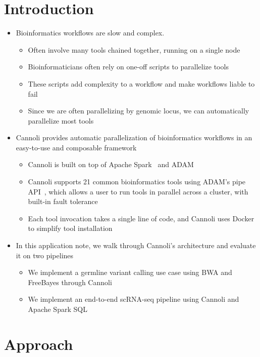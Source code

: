 \documentclass{bioinfo}
\begin{document}
\section{Introduction}

\begin{itemize}
\item Bioinformatics workflows are slow and complex.
  \begin{itemize}
  \item Often involve many tools chained together, running on a single node
  \item Bioinformaticians often rely on one-off scripts to parallelize tools
  \item These scripts add complexity to a workflow and make workflows liable to fail
  \item Since we are often parallelizing by genomic locus, we can automatically parallelize most tools
  \end{itemize}
\item Cannoli provides automatic parallelization of bioinformatics workflows in an easy-to-use and
  composable framework
  \begin{itemize}
  \item Cannoli is built on top of Apache Spark~\citep{zaharia12} and ADAM~\citep{massie13, nothaft15}
  \item Cannoli supports 21 common bioinformatics tools using ADAM's pipe API~\citep{nothaft17}, which
    allows a user to run tools in parallel across a cluster, with built-in fault tolerance
  \item Each tool invocation takes a single line of code, and Cannoli uses Docker to simplify tool
    installation~\citep{daveiga17}
  \end{itemize}
\item In this application note, we walk through Cannoli's architecture and evaluate it on two pipelines
  \begin{itemize}
  \item We implement a germline variant calling use case using BWA and FreeBayes through Cannoli
  \item We implement an end-to-end scRNA-seq pipeline using Cannoli and Apache Spark SQL
  \end{itemize}
\end{itemize}


\section{Approach}
\end{document}
